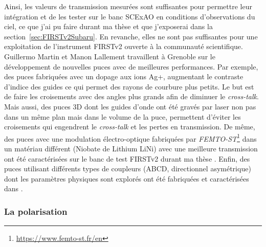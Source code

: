 Ainsi, les valeurs de transmission mesurées sont suffisantes pour permettre leur intégration et de les tester sur le banc \ac{SCExAO} en conditions d'observations du ciel, ce que j'ai pu faire durant ma thèse et que j'exposerai dans la section~\ref{sec:FIRSTv2Subaru}. En revanche, elles ne sont pas suffisantes pour une exploitation de l'instrument \ac{FIRSTv2} ouverte à la communauté scientifique. Guillermo Martin et Manon Lallement travaillent à Grenoble sur le développement de nouvelles puces avec de meilleures performances. Par exemple, des puces fabriquées avec un dopage aux ions Ag+, augmentant le contraste d'indice des guides ce qui permet des rayons de courbure plus petits. Le but est de faire les croisements avec des angles plus grands afin de diminuer le \textit{cross-talk}. Mais aussi, des puces 3D \citep{martin2022a} dont les guides d'onde ont été gravés par laser non pas dans un même plan mais dans le volume de la puce, permettent d'éviter les croisements qui engendrent le \textit{cross-talk} et les pertes en transmission. De même, des puces avec une modulation électro-optique fabriquées par \textit{FEMTO-ST}\footnote{\url{https://www.femto-st.fr/en}} dans un matériau différent (Niobate de Lithium LiNi) avec une meilleure transmission ont été caractérisées sur le banc de test \ac{FIRSTv2} durant ma thèse \citep{martin2022b}. Enfin, des puces utilisant différents types de coupleurs (ABCD, directionnel asymétrique) dont les paramètres physiques sont explorés ont été fabriquées et caractérisées dans \cite{lallement2022}.


\subsubsection{La polarisation}
\label{sec:ChipPolar}

